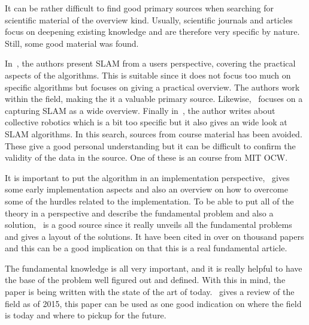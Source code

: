It can be rather difficult to find good primary sources when searching for
scientific material of the overview kind. Usually, scientific journals and
articles focus on deepening existing knowledge and are therefore very specific
by nature. Still, some good material was found.

In~\cite{Frese2010}, the authors present SLAM from a users perspective, covering
the practical aspects of the algorithms. This is suitable since it does not
focus too much on specific algorithms but focuses on giving a practical
overview. The authors work within the field, making the it a valuable primary
source. Likewise,~\cite{5769022} focuses on a capturing SLAM as a wide overview.
Finally in~\cite{Kernbach20131}, the author writes about collective robotics
which is a bit too specific but it also gives an wide look at SLAM algorithms.
In this search, sources from course material has been avoided. These give a good
personal understanding but it can be difficult to confirm the validity of the
data in the source. One of these is an course from MIT OCW\@.

It is important to put the algorithm in an implementation
perspective,~\cite{844732} gives some early implementation aspects and also an
overview on how to overcome some of the hurdles related to the implementation.
To be able to put all of the theory in a perspective and describe the
fundamental problem and also a solution,~\cite{938381} is a good source since it
really unveils all the fundamental problems and gives a layout of the
solutions. It have been cited in over on thousand papers and this can be a good
implication on that this is a real fundamental article.

The fundamental knowledge is all very important, and it is really helpful to
have the base of the problem well figured out and defined. With this in mind,
the paper is being written with the state of the art of today.~\cite{7482163}
gives a review of the field as of 2015, this paper can be used as one good
indication on where the field is today and where to pickup for the future.
